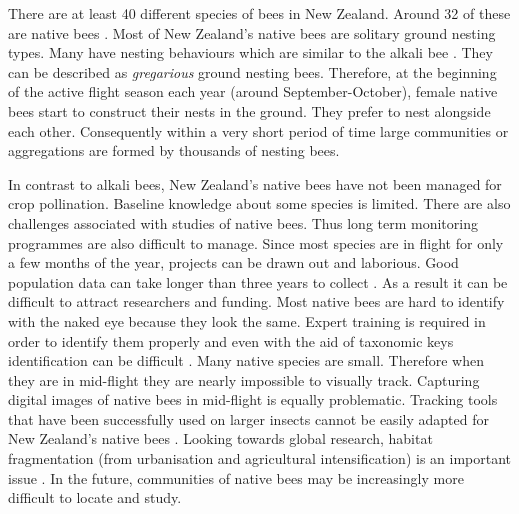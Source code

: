 There are at least 40 different species of bees in New Zealand. Around 32 of these are native bees \cite{Donovan2007}. Most of New Zealand's native bees are solitary ground nesting types. Many have nesting behaviours which are similar to the alkali bee \cite{Canej2003}. They can be described as \emph{gregarious} ground nesting bees. Therefore, at the beginning of the active flight season each year (around September-October), female native bees start to construct their nests in the ground. They prefer to nest alongside each other. Consequently within a very short period of time large communities or aggregations are formed by thousands of nesting bees.

In contrast to alkali bees, New Zealand's native bees have not been managed for crop pollination. Baseline knowledge about some species is limited. There are also challenges associated with studies of native bees. Thus long term monitoring programmes are also difficult to manage. Since most species are in flight for only a few months of the year, projects can be drawn out and laborious. Good population data can take longer than three years to collect \cite{Cane2008}. As a result it can be difficult to  attract researchers and funding. Most native bees are hard to identify with the naked eye because they look the same. Expert training is required in order to identify them properly and even with the aid of taxonomic keys identification can be difficult \cite{Wheeler2004,de2007}. Many native species are small. Therefore when they are in mid-flight they are nearly impossible to visually track. Capturing digital images of native bees in mid-flight is equally problematic. Tracking tools that have been successfully used on larger insects cannot be easily adapted for New Zealand's native bees \cite{Osborne1999, Hart2007}. Looking towards global research, habitat fragmentation (from urbanisation and agricultural intensification) is an important issue \cite{Steffan2003}. In the future, communities of native bees may be increasingly more difficult to locate and study.

